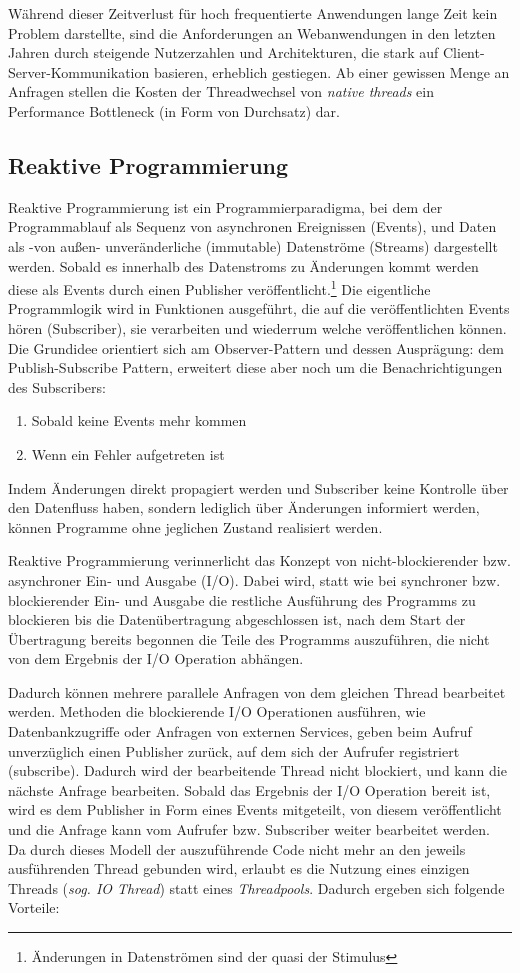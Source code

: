 Während dieser Zeitverlust für hoch frequentierte Anwendungen lange Zeit kein Problem darstellte,
sind die Anforderungen an Webanwendungen in den letzten Jahren durch steigende Nutzerzahlen und Architekturen,
die stark auf Client-Server-Kommunikation basieren, erheblich gestiegen.
Ab einer gewissen Menge an Anfragen stellen die Kosten der Threadwechsel von \textit{native threads} ein Performance Bottleneck
(in Form von Durchsatz) dar.
\newpage
\subsection{Reaktive Programmierung}
\label{section:reaktive_programmierung}
Reaktive Programmierung ist ein Programmierparadigma, bei dem der Programmablauf als Sequenz von asynchronen Ereignissen (Events), und
Daten als -von außen- unveränderliche (immutable) Datenströme (Streams) dargestellt werden.
Sobald es innerhalb des Datenstroms zu Änderungen kommt werden diese als Events durch einen Publisher veröffentlicht.\footnote{Änderungen in Datenströmen
    sind der quasi der Stimulus}
Die eigentliche Programmlogik wird in Funktionen ausgeführt, die auf die veröffentlichten Events hören (Subscriber), sie verarbeiten und wiederrum welche
veröffentlichen können. Die Grundidee orientiert sich am Observer-Pattern und dessen Ausprägung: dem Publish-Subscribe Pattern, erweitert diese aber
noch um die Benachrichtigungen des Subscribers:
\begin{enumerate}
    \item Sobald keine Events mehr kommen
    \item Wenn ein Fehler aufgetreten ist
\end{enumerate}
Indem Änderungen direkt propagiert werden und Subscriber keine Kontrolle über den Datenfluss haben, sondern lediglich über Änderungen informiert werden,
können Programme ohne jeglichen Zustand realisiert werden\parencite{Escoffier2017}.

Reaktive Programmierung verinnerlicht das Konzept von nicht-blockierender bzw. asynchroner Ein- und Ausgabe (I/O).
Dabei wird, statt wie bei synchroner bzw. blockierender Ein- und Ausgabe die restliche Ausführung des Programms
zu blockieren bis die Datenübertragung abgeschlossen ist, nach dem Start der Übertragung bereits begonnen die Teile des
Programms auszuführen, die nicht von dem Ergebnis der I/O Operation abhängen.

Dadurch können mehrere parallele Anfragen von dem gleichen Thread bearbeitet werden.
Methoden die blockierende I/O Operationen ausführen, wie Datenbankzugriffe oder Anfragen von externen Services,
geben beim Aufruf unverzüglich einen Publisher zurück, auf dem sich der Aufrufer registriert (subscribe).
Dadurch wird der bearbeitende Thread nicht blockiert, und kann die nächste Anfrage bearbeiten.
Sobald das Ergebnis der I/O Operation bereit ist, wird es dem Publisher in Form eines Events mitgeteilt, von diesem veröffentlicht und die Anfrage kann
vom Aufrufer bzw. Subscriber weiter bearbeitet werden.
Da durch dieses Modell der auszuführende Code nicht mehr an den jeweils ausführenden Thread gebunden wird, erlaubt es die Nutzung eines einzigen
Threads (\textit{sog. IO Thread}) statt eines \textit{Threadpools}.
Dadurch ergeben sich folgende Vorteile:

